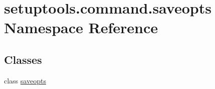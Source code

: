 \hypertarget{namespacesetuptools_1_1command_1_1saveopts}{}\section{setuptools.\+command.\+saveopts Namespace Reference}
\label{namespacesetuptools_1_1command_1_1saveopts}
\subsection*{Classes}
\begin{DoxyCompactItemize}
\item 
class \hyperlink{classsetuptools_1_1command_1_1saveopts_1_1saveopts}{saveopts}
\end{DoxyCompactItemize}
